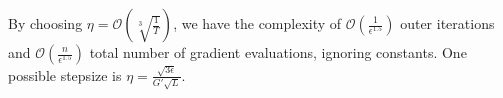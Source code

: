 \documentclass{article} %
\theoremstyle{plain}
\newtheorem{theorem}{Theorem}[section]
\theoremstyle{definition}
\theoremstyle{remark}
\begin{document}

By choosing $\eta=\mathcal{O}(\sqrt[3]{\frac{1}{T}})$, we have the complexity of $\mathcal{O}(\frac{1}{\epsilon^{1.5}})$ outer iterations and $\mathcal{O}(\frac{n}{\epsilon^{1.5}})$ total number of gradient evaluations, ignoring constants. One possible stepsize is $\eta=\frac{\sqrt{3\epsilon}}{G'\sqrt{L}}.$




\end{document}
